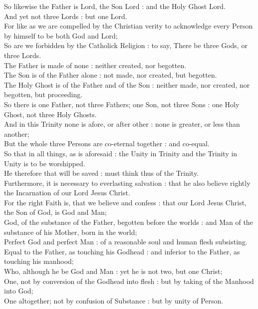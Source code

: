 So likewise the Father is Lord, the Son Lord : and the Holy Ghost Lord.\\
And yet not three Lords : but one Lord.\\
For like as we are compelled by the Christian verity to acknowledge every Person by himself to be both God and Lord;\\
\newpage
So are we forbidden by the Catholick Religion : to say, There be three Gods, or three Lords.\\
The Father is made of none : neither created, nor begotten.\\
The Son is of the Father alone : not made, nor created, but begotten.\\
The Holy Ghost is of the Father and of the Son : neither made, nor created, nor begotten, but proceeding.\\
So there is one Father, not three Fathers; one Son, not three Sons : one Holy Ghost, not three Holy Ghosts.\\
And in this Trinity none is afore, or after other : none is greater, or less than another;\\
But the whole three Persons are co-eternal together : and co-equal.\\
So that in all things, as is aforesaid : the Unity in Trinity and the Trinity in Unity is to be worshipped.\\
He therefore that will be saved : must think thus of the Trinity.\\
Furthermore, it is necessary to everlasting salvation : that he also believe rightly the Incarnation of our Lord Jesus Christ.\\
For the right Faith is, that we believe and confess : that our Lord Jesus Christ, the Son of God, is God and Man;\\
God, of the substance of the Father, begotten before the worlds : and Man of the substance of his Mother, born in the world;\\
Perfect God and perfect Man : of a reasonable soul and human flesh subsisting.\\
Equal to the Father, as touching his Godhead : and inferior to the Father, as touching his manhood;\\
Who, although he be God and Man : yet he is not two, but one Christ;\\
One, not by conversion of the Godhead into flesh : but by taking of the Manhood into God;\\
One altogether; not by confusion of Substance : but by unity of Person.\\
